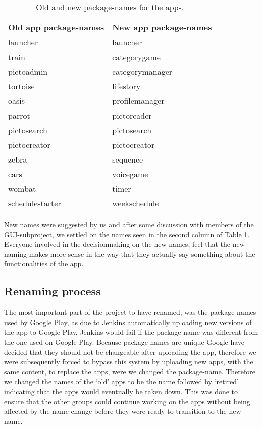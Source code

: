 \begin{table}
	\centering
	\begin{tabular}{ll}
		\textbf{Old app package-names} & \textbf{New app package-names}\\ \hline \noalign{\vskip 2mm}
		launcher & launcher\\ \hline
		train & categorygame\\ \hline
		pictoadmin & categorymanager\\ \hline
		tortoise & lifestory\\ \hline
		oasis & profilemanager\\ \hline
		parrot & pictoreader\\ \hline
		pictosearch & pictosearch\\ \hline
		pictocreator & pictocreator\\ \hline
		zebra & sequence\\ \hline
		cars & voicegame\\ \hline
		wombat & timer\\ \hline
		schedulestarter & weekschedule\\ \hline
	\end{tabular}
	\caption{Old and new package-names for the apps.}
	\label{Sprint3_package_names_apps}
\end{table}

New names were suggested by us and after some discussion with members of the GUI-subproject, we settled on the names seen in the second column of Table \ref{Sprint3_package_names_apps}. Everyone involved in the decisionmaking on the new names, feel that the new naming makes more sense in the way that they actually say something about the functionalities of the app.

\subsection{Renaming process}
The most important part of the project to have renamed, was the package-names used by Google Play, as due to Jenkins automatically uploading new versions of the app to Google Play, Jenkins would fail if the package-name was different from the one used on Google Play. Because package-names are unique Google have decided that they should not be changeable after uploading the app, therefore we were subsequently forced to bypass this system by uploading new apps, with the same content, to replace the apps, were we changed the package-name. Therefore we changed the names of the ‘old’ apps to be the name followed by ‘retired’ indicating that the apps would eventually be taken down. This was done to ensure that the other groups could continue working on the apps without being affected by the name change before they were ready to transition to the new name.


